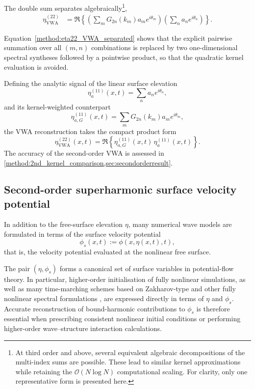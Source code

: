 \documentclass[lineno]{JFM-FLM_Au}
\begin{document}
The double sum separates algebraically\footnote{At third order and above, several equivalent algebraic decompositions of the multi-index sums are possible. These lead to similar kernel approximations while retaining the $\mathcal{O}(N\log N)$ computational scaling. For clarity, only one representative form is presented here.},
\begin{align}\label{method:eta22_VWA_separated}
\eta^{(22)}_{\mathrm{VWA}}
&=
\Re\left\{
\left(
\sum_m G_{2n}(k_m)a_m e^{i\theta_m}
\right)
\left(
\sum_n a_n e^{i\theta_n}
\right)
\right\}.
\end{align}

Equation~\eqref{method:eta22_VWA_separated} shows that the explicit pairwise summation over all $(m,n)$ combinations is replaced by two one-dimensional spectral syntheses followed by a pointwise product, so that the quadratic kernel evaluation is avoided.

Defining the analytic signal of the linear surface elevation
\[
\eta_a^{(11)}(x,t)
=
\sum_n a_n e^{i\theta_n},
\]
and its kernel-weighted counterpart
\[
\eta_{a,G}^{(11)}(x,t)
=
\sum_m G_{2n}(k_m)a_m e^{i\theta_m},
\]
the VWA reconstruction takes the compact product form
\begin{equation}\label{method:eta22_VWA_final}
\eta^{(22)}_{\mathrm{VWA}}(x,t)
=
\Re\left\{
\eta_{a,G}^{(11)}(x,t)\,
\eta_a^{(11)}(x,t)
\right\}.
\end{equation}
The accuracy of the second-order VWA is assessed in \cref{method:2nd_kernel_comparison,sec:secondorderresult}.

\subsection{Second-order superharmonic surface velocity potential}

In addition to the free-surface elevation $\eta$, many numerical wave models are formulated in terms of the surface velocity potential
\begin{equation}
\phi_s(x,t) := \phi(x,\eta(x,t),t),
\end{equation}
that is, the velocity potential evaluated at the nonlinear free surface.

The pair $(\eta,\phi_s)$ forms a canonical set of surface variables in potential-flow theory. 
In particular, higher-order initialisation of fully nonlinear simulations, as well as many time-marching schemes based on Zakharov-type and other fully nonlinear spectral formulations \citep{craigNumericalSimulationGravity1993,batemanCalculationWaterParticle2003}, are expressed directly in terms of $\eta$ and $\phi_s$. 
Accurate reconstruction of bound-harmonic contributions to $\phi_s$ is therefore essential when prescribing consistent nonlinear initial conditions or performing higher-order wave--structure interaction calculations.
\end{document}
